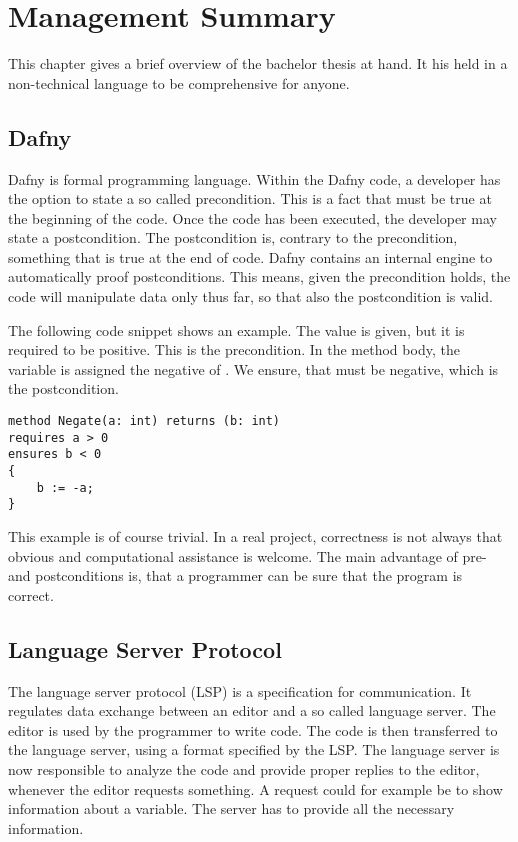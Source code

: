 \section{Management Summary}
\label{section:introduction}
This chapter gives a brief overview of the bachelor thesis at hand.
It his held in a non-technical language to be comprehensive for anyone.

\subsection{Dafny}
\label{section:introduction:dafny}
Dafny is formal programming language.
Within the Dafny code, a developer has the option to state a so called precondition.
This is a fact that must be true at the beginning of the code.
Once the code has been executed, the developer may state a postcondition.
The postcondition is, contrary to the precondition, something that is true at the end of code.
Dafny contains an internal engine to automatically proof postconditions.
This means, given the precondition holds, the code will manipulate data only thus far, so that also the postcondition is valid.

The following code snippet shows an example.
The value  is given, but it is required to be positive.
This is the precondition.
In the method body, the variable  is assigned the negative of .
We ensure, that  must be negative, which is the postcondition.
\begin{lstlisting}[language=dafny, caption={Simple Dafny Example}, captionpos=b, label={lst:simpleDafnyExample}]
method Negate(a: int) returns (b: int)
requires a > 0
ensures b < 0
{
    b := -a;
}
\end{lstlisting}
This example is of course trivial.
In a real project, correctness is not always that obvious and computational assistance is welcome.
The main advantage of pre- and postconditions is, that a programmer can be sure that the program is correct.


\subsection{Language Server Protocol}
The language server protocol (LSP) is a specification for communication.
It regulates data exchange between an editor and a so called language server.
The editor is used by the programmer to write code.
The code is then transferred to the language server, using a format specified by the LSP.
The language server is now responsible to analyze the code and provide proper replies to the editor, whenever the editor requests something.
A request could for example be to show information about a variable.
The server has to provide all the necessary information.\\


